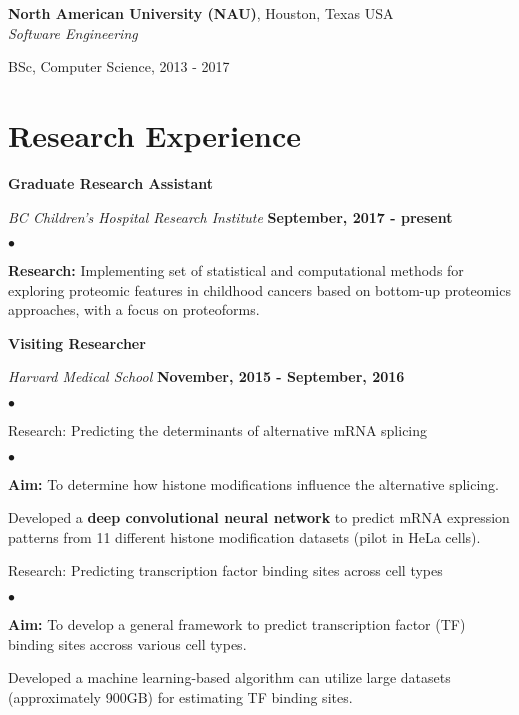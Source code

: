 \documentclass[margin,line]{res}
\newenvironment{list1}{
  \begin{list}{\ding{113}}{%
      \setlength{\itemsep}{0in}
      \setlength{\parsep}{0in} \setlength{\parskip}{0in}
      \setlength{\topsep}{0in} \setlength{\partopsep}{0in}
      \setlength{\leftmargin}{0.17in}}}{\end{list}}
\newenvironment{list2}{
  \begin{list}{$\bullet$}{%
      \setlength{\itemsep}{0in}
      \setlength{\parsep}{0in} \setlength{\parskip}{0in}
      \setlength{\topsep}{0in} \setlength{\partopsep}{0in}
      \setlength{\leftmargin}{0.2in}}}{\end{list}}
\begin{document}
\begin{resume}
{\bf North American University (NAU)}, Houston, Texas USA\\
{\em Software Engineering}
\begin{list1}
\item[] BSc, Computer Science,  2013 - 2017
\end{list1}


\section{\sc Research Experience}

{\bf Graduate Research Assistant}

\vspace{-.3cm}
{\em BC Children's Hospital Research Institute} \hfill {\bf September, 2017 - present}\\
\vspace{-.3cm}
\begin{list2}
\item {\bf Research:} Implementing set of statistical and computational methods for exploring proteomic features in childhood cancers based on bottom-up proteomics approaches, with a focus on proteoforms.
\end{list2}

{\bf Visiting Researcher}

\vspace{-.3cm}
{\em Harvard Medical School} \hfill {\bf November, 2015 - September, 2016}\\
\vspace{-.3cm}
\begin{list2}
\item Research: Predicting the determinants of alternative mRNA splicing
\begin{list2}
\item {\bf Aim:} To determine how histone modifications influence the alternative splicing.
\item Developed a {\bf deep convolutional neural network} to predict mRNA expression patterns from 11 different histone modification datasets (pilot in HeLa cells).

\end{list2}
\item Research: Predicting transcription factor binding sites across cell types
\begin{list2}
\item {\bf Aim:} To develop a general framework to predict transcription factor (TF) binding sites accross various cell types.
\item Developed a machine learning-based algorithm can utilize large datasets (approximately 900GB) for estimating TF binding sites.
\end{list2}
\end{list2}


\end{resume}
\end{document}
